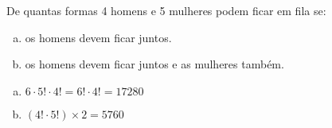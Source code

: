 \begin{ex}
 De quantas formas 4 homens e 5 mulheres podem ficar em fila se: 
    \begin{enumerate}[(a)]
    \item os homens devem ficar juntos.
    \item os homens devem ficar juntos e as mulheres também.
    \end{enumerate}
    \begin{sol}
        \phantom{A} 
     \begin{enumerate}  [(a)]
         \item $6\cdot5!\cdot4!=6!\cdot4!=17280$
         \item $(4!\cdot5!)\times2 = 5760$
         
     \end{enumerate}
    \end{sol}
\end{ex}